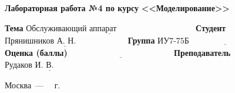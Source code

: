 \begin{titlepage}
\begin{center}
\Large\textbf{Лабораторная работа №4 по курсу}
\Large\textbf{\hspace*{60pt}<<Моделирование>>}\newline\newline\newline
\end{center}

\noindent\textbf{Тема} $\underline{\text{Обслуживающий аппарат~~~~~~~~~~~~~~~~~~~~~~~~~~~~}}$\newline\newline
\noindent\textbf{Студент} $\underline{\text{Прянишников А. Н.~~~~~~~~~~~~~~~~~~}}$\newline\newline
\noindent\textbf{Группа} $\underline{\text{ИУ7-75Б~~~~~~~~~~~~~~~~~~~~~~~~~~~~~~~~~~~~~~}}$\newline\newline
\noindent\textbf{Оценка (баллы)} $\underline{\text{~~~~~~~~~~~~~~~~~~~~~~~~~~~~~~~~~~~~~}}$\newline\newline
\noindent\textbf{Преподаватель} $\underline{\text{Рудаков~И.~В.~~~~~~~~~~~~~~~}}$\newline

\begin{center}
\vfill
Москва~---~\the\year
~г.
\end{center}
\restoregeometry
\end{titlepage}